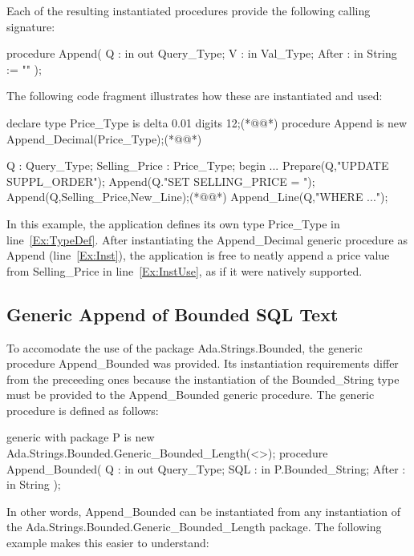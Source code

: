 \documentclass[english,letterpaper]{book}
\begin{document}
Each of the resulting instantiated procedures provide the following
calling signature:

\begin{Code}
procedure Append(
   Q :     in out Query_Type;
   V :     in     Val_Type;
   After : in     String := ""
);
\end{Code}

The following code fragment illustrates how these are instantiated and used:

\begin{NumberedExample}
declare
   type Price_Type is delta 0.01 digits 12;(*@\label{Ex:TypeDef}@*)
   procedure Append is new Append_Decimal(Price_Type);(*@\label{Ex:Inst}@*)

   Q :             Query_Type;
   Selling_Price : Price_Type;
begin
   ...
   Prepare(Q,"UPDATE SUPPL_ORDER");
   Append(Q."SET SELLING_PRICE = ");
   Append(Q,Selling_Price,New_Line);(*@\label{Ex:InstUse}@*)
   Append_Line(Q,"WHERE ...");
\end{NumberedExample}

In this example, the application defines its own type Price\_Type
in line~\ref{Ex:TypeDef}. After instantiating the Append\_Decimal
generic procedure as Append (line~\ref{Ex:Inst}), the application is
free to neatly append a price value from Selling\_Price in
line~\ref{Ex:InstUse}, as if it were natively supported.



\subsection{Generic Append of Bounded SQL Text}

To accomodate the use of the package Ada\-.Strings\-.Bounded,
the generic procedure Append\_Bounded was provided. Its instantiation
requirements differ from the preceeding ones because the instantiation
of the Bounded\_String type must be provided to the Append\_Bounded
generic procedure. The generic procedure is defined as follows:

\begin{Code}
generic
   with package P 
      is new Ada.Strings.Bounded.Generic_Bounded_Length(<>);
procedure Append_Bounded(
   Q :     in out Query_Type;
   SQL :   in     P.Bounded_String;
   After : in     String
);
\end{Code}

In other words, Append\_Bounded can be instantiated from any instantiation
of the Ada.Strings.Bounded.Generic\_Bounded\_Length package. The following
example makes this easier to understand:
\end{document}
